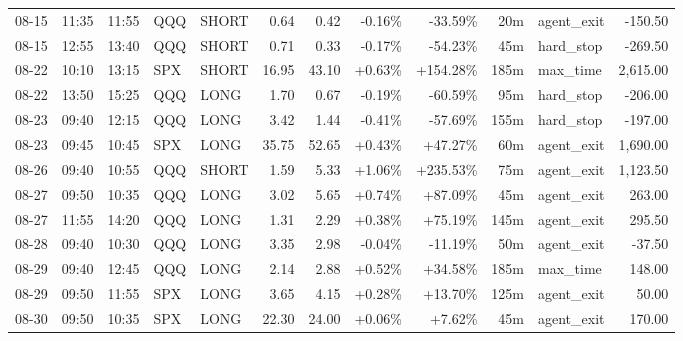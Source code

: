 \documentclass[11pt,a4paper,twoside]{article}
\begin{document}
\begin{center}
\begin{longtable}{>{\color{txtmain}}l l l l l r r r r r >{\color{txtmain}}l r}
08-15 & 11:35 & 11:55 & QQQ & SHORT & 0.64 & 0.42 & \textcolor{lossred}{-0.16\%} & \textcolor{lossred}{-33.59\%} & 20m & agent\_exit & \textcolor{lossred}{-150.50} \\
08-15 & 12:55 & 13:40 & QQQ & SHORT & 0.71 & 0.33 & \textcolor{lossred}{-0.17\%} & \textcolor{lossred}{-54.23\%} & 45m & hard\_stop & \textcolor{lossred}{-269.50} \\
08-22 & 10:10 & 13:15 & SPX & SHORT & 16.95 & 43.10 & \textcolor{wingreen}{+0.63\%} & \textcolor{wingreen}{+154.28\%} & 185m & max\_time & \textcolor{wingreen}{2,615.00} \\
08-22 & 13:50 & 15:25 & QQQ & LONG & 1.70 & 0.67 & \textcolor{lossred}{-0.19\%} & \textcolor{lossred}{-60.59\%} & 95m & hard\_stop & \textcolor{lossred}{-206.00} \\
08-23 & 09:40 & 12:15 & QQQ & LONG & 3.42 & 1.44 & \textcolor{lossred}{-0.41\%} & \textcolor{lossred}{-57.69\%} & 155m & hard\_stop & \textcolor{lossred}{-197.00} \\
08-23 & 09:45 & 10:45 & SPX & LONG & 35.75 & 52.65 & \textcolor{wingreen}{+0.43\%} & \textcolor{wingreen}{+47.27\%} & 60m & agent\_exit & \textcolor{wingreen}{1,690.00} \\
08-26 & 09:40 & 10:55 & QQQ & SHORT & 1.59 & 5.33 & \textcolor{wingreen}{+1.06\%} & \textcolor{wingreen}{+235.53\%} & 75m & agent\_exit & \textcolor{wingreen}{1,123.50} \\
08-27 & 09:50 & 10:35 & QQQ & LONG & 3.02 & 5.65 & \textcolor{wingreen}{+0.74\%} & \textcolor{wingreen}{+87.09\%} & 45m & agent\_exit & \textcolor{wingreen}{263.00} \\
08-27 & 11:55 & 14:20 & QQQ & LONG & 1.31 & 2.29 & \textcolor{wingreen}{+0.38\%} & \textcolor{wingreen}{+75.19\%} & 145m & agent\_exit & \textcolor{wingreen}{295.50} \\
08-28 & 09:40 & 10:30 & QQQ & LONG & 3.35 & 2.98 & \textcolor{lossred}{-0.04\%} & \textcolor{lossred}{-11.19\%} & 50m & agent\_exit & \textcolor{lossred}{-37.50} \\
08-29 & 09:40 & 12:45 & QQQ & LONG & 2.14 & 2.88 & \textcolor{wingreen}{+0.52\%} & \textcolor{wingreen}{+34.58\%} & 185m & max\_time & \textcolor{wingreen}{148.00} \\
08-29 & 09:50 & 11:55 & SPX & LONG & 3.65 & 4.15 & \textcolor{wingreen}{+0.28\%} & \textcolor{wingreen}{+13.70\%} & 125m & agent\_exit & \textcolor{wingreen}{50.00} \\
08-30 & 09:50 & 10:35 & SPX & LONG & 22.30 & 24.00 & \textcolor{wingreen}{+0.06\%} & \textcolor{wingreen}{+7.62\%} & 45m & agent\_exit & \textcolor{wingreen}{170.00} \\

\end{longtable}
\end{center}
\end{document}
